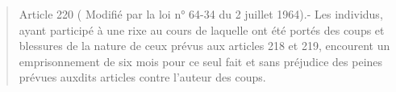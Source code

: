 \begin{quote}\small Article 220 ( Modifié par la loi n° 64-34 du 2 juillet 1964).- Les individus, ayant participé à une rixe au cours de laquelle ont été portés des coups et blessures de la nature de ceux prévus aux articles 218 et 219, encourent un emprisonnement de six mois pour ce seul fait et sans préjudice des peines prévues auxdits articles contre l'auteur des coups.\end{quote}